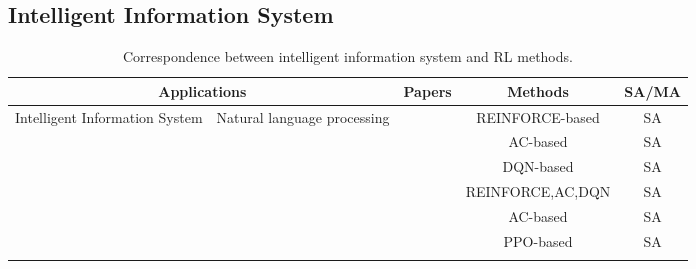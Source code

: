 \documentclass[acmsmall]{acmart}
\begin{document}
\subsection{Intelligent Information System}
\begin{table}[]
\centering
\caption{Correspondence between intelligent information system and RL methods.}
\label{information}
\begin{tabularx}{\textwidth}{|XX|c|c|c|}
\hline
\multicolumn{2}{|c|}{Applications}                                                                                      & Papers                                                          & Methods                                                  & SA/MA \\ \hline
\multicolumn{1}{|X|}{\multirow{12}{=}{\centering Intelligent Information System}} & \multirow{6}{=}{\centering Natural language   processing} & \cite{li2016deep}                                               & REINFORCE-based \cite{REINFORCE}                         & SA       \\ \cline{3-5} 
\multicolumn{1}{|X|}{}                                                 &                                                & \cite{9025776}                                                  & AC-based \cite{ac}                                       & SA       \\ \cline{3-5} 
\multicolumn{1}{|X|}{}                                                 &                                                & \cite{Lu_Zhang_Chen_2019}                                       & DQN-based \cite{dqn}                                     & SA       \\ \cline{3-5} 
\multicolumn{1}{|X|}{}                                                 &                                                & \cite{8801910}                                                  & REINFORCE,AC,DQN \cite{REINFORCE,ac,dqn} & SA       \\ \cline{3-5} 
\multicolumn{1}{|X|}{}                                                 &                                                & \cite{li2017paraphrase}                                         & AC-based \cite{ac}                                       & SA       \\ \cline{3-5} 
\multicolumn{1}{|X|}{}                                                 &                                                & \cite{NEURIPS2022_b1efde53}                                     & PPO-based \cite{ppo}                                     & SA       \\ \cline{2-5} 

\end{tabularx}
\end{table}
\end{document}
